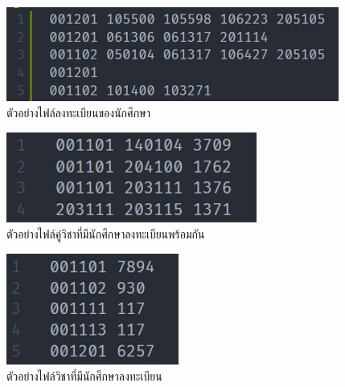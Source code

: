 \begin{figure}
  \begin{center}
    \includegraphics[]{images/regist1.png}
  \end{center}
  \caption[ตัวอย่างไฟล์ลงทะเบียนของนักศึกษา]{ตัวอย่างไฟล์ลงทะเบียนของนักศึกษา}
  \label{fig:regist}     
\end{figure}
\begin{figure}
  \begin{center}
    \includegraphics[]{images/conflicts1.png}
  \end{center}
  \caption[ตัวอย่างไฟล์คู่วิชาที่มีนักศึกษาลงทะเบียนพร้อมกัน]{ตัวอย่างไฟล์คู่วิชาที่มีนักศึกษาลงทะเบียนพร้อมกัน}
  \label{fig:conflicts}     
\end{figure}
\begin{figure}
  \begin{center}
    \includegraphics[]{images/courses1.png}
  \end{center}
  \caption[ตัวอย่างไฟล์วิชาที่มีนักศึกษาลงทะเบียน]{ตัวอย่างไฟล์วิชาที่มีนักศึกษาลงทะเบียน}
  \label{fig:courses}     
\end{figure}
